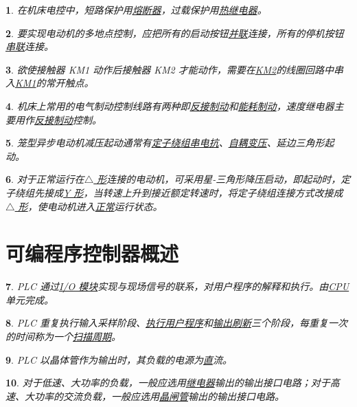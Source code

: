 \documentclass{ctexart}
\theoremstyle{change}
\newtheorem{ti}{}[section]
\begin{document}
\begin{ti}
	在机床电控中，短路保护用\uline{熔断器}，过载保护用\uline{热继电器}。
\end{ti}

\begin{ti}
	要实现电动机的多地点控制，应把所有的启动按钮\uline{并联}连接，所有的停机按钮\uline{串联}连接。
\end{ti}

\begin{ti}
	欲使接触器 KM1 动作后接触器 KM2 才能动作，需要在\uline{KM2}的线圈回路中串入\uline{KM1}的常开触点。
\end{ti}

\begin{ti}
	机床上常用的电气制动控制线路有两种即\uline{反接制动}和\uline{能耗制动}，速度继电器主要用作\uline{反接制动}控制。
\end{ti}

\begin{ti}
	笼型异步电动机减压起动通常有\uline{定子绕组串电抗}、\uline{自耦变压}、延边三角形起动。
\end{ti}

\begin{ti}
	对于正常运行在\uline{$\triangle$ 形}连接的电动机，可采用星-三角形降压启动，即起动时，定子绕组先接成\uline{Y 形}，当转速上升到接近额定转速时，将定子绕组连接方式改接成\uline{$\triangle$ 形}，使电动机进入\uline{正常}运行状态。
\end{ti}

\section{可编程序控制器概述}

\begin{ti}
	PLC 通过\uline{I/O 模块}实现与现场信号的联系，对用户程序的解释和执行。由\uline{CPU}单元完成。
\end{ti}

\begin{ti}
	PLC 重复执行输入采样阶段、\uline{执行用户程序}和\uline{输出刷新}三个阶段，每重复一次的时间称为一个\uline{扫描周期}。
\end{ti}

\begin{ti}
	PLC 以晶体管作为输出时，其负载的电源为\uline{直}流。
\end{ti}

\begin{ti}
	对于低速、大功率的负载，一般应选用\uline{继电器}输出的输出接口电路；对于高速、大功率的交流负载，一般应选用\uline{晶闸管}输出的输出接口电路。
\end{ti}
\end{document}
